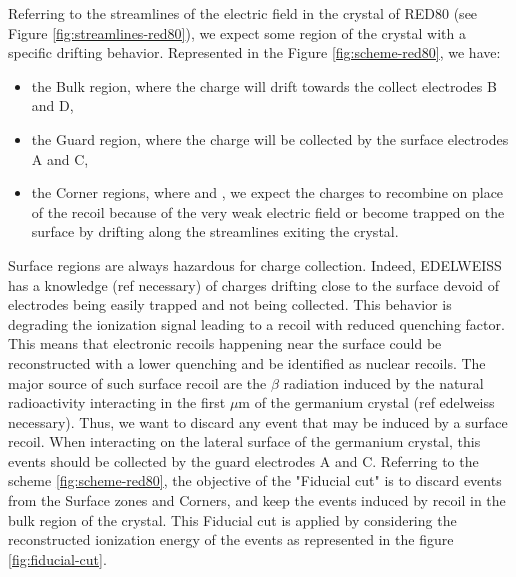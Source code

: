 Referring to the streamlines of the electric field in the crystal of RED80 (see Figure \ref{fig:streamlines-red80}), we expect some region of the crystal with a specific drifting behavior. Represented in the Figure \ref{fig:scheme-red80}, we have:
\begin{itemize}
	\item the Bulk region, where the charge will drift towards the collect electrodes B and D,
	\item the Guard region, where the charge will be collected by the surface electrodes A and C,
	\item the Corner regions, where and , we expect the charges to recombine on place of the recoil because of the very weak electric field or become trapped on the surface by drifting along the streamlines exiting the crystal.
\end{itemize}

Surface regions are always hazardous for charge collection. Indeed, EDELWEISS has a knowledge (ref necessary) of charges drifting close to the surface devoid of electrodes being easily trapped and not being collected. This behavior is degrading the ionization signal leading to a recoil with reduced quenching factor. This means that electronic recoils happening near the surface could be reconstructed with a lower quenching and be identified as nuclear recoils. The major source of such surface recoil are the $\beta$ radiation induced by the natural radioactivity interacting in the first $\mu$m of the germanium crystal (ref edelweiss necessary). Thus, we want to discard any event that may be induced by a surface recoil. When interacting on the lateral surface of the germanium crystal, this events should be collected by the guard electrodes A and C. Referring to the scheme \ref{fig:scheme-red80}, the objective of the "Fiducial cut" is to discard events from the Surface zones and Corners, and keep the events induced by recoil in the bulk region of the crystal. This Fiducial cut is applied by considering the reconstructed ionization energy of the events as represented in the figure \ref{fig:fiducial-cut}.


